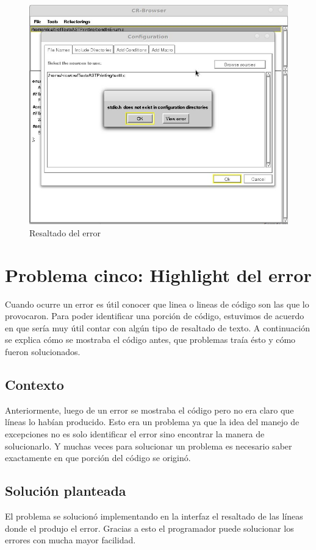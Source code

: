 \documentclass[a4paper,oneside,10pt]{article}
\begin{document}
\begin{figure}[h!]
  \centering
    \includegraphics[scale=0.50]{images/codigo_modificado/error_header_no_encontrado.jpg}
     \caption{Resaltado del error}
\end{figure}

\section{Problema cinco: Highlight del error}

Cuando ocurre un error es útil conocer que linea o lineas de código son las que lo provocaron. Para poder identificar una porción de código, estuvimos de acuerdo en que sería muy útil contar con algún tipo de resaltado de texto. A continuación se explica cómo se mostraba el código antes, que problemas traía ésto y cómo fueron solucionados.

\subsection{Contexto}
Anteriormente, luego de un error se mostraba el c\'odigo pero no era claro que l\'ineas lo hab\'ian producido. Esto era un problema ya que la idea del manejo de excepciones no es solo identificar el error sino encontrar la manera de solucionarlo. Y muchas veces para solucionar un problema es necesario saber exactamente en que porci\'on del c\'odigo se origin\'o.

\subsection{Soluci\'on planteada}
El problema se solucion\'o implementando en la interfaz el resaltado de las l\'ineas donde el produjo el error. Gracias a esto el programador puede solucionar los errores con mucha mayor facilidad.
\end{document}
